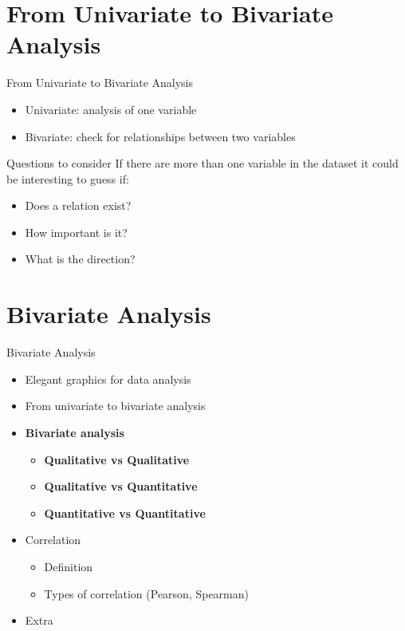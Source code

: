 \documentclass[
  ignorenonframetext,
]{beamer}
\providecommand{\tightlist}{%
  \setlength{\itemsep}{0pt}\setlength{\parskip}{0pt}}
\begin{document}
\section{From Univariate to Bivariate
Analysis}\label{from-univariate-to-bivariate-analysis-1}

\begin{frame}{From Univariate to Bivariate Analysis}
\begin{itemize}
\tightlist
\item
  Univariate: analysis of one variable
\item
  Bivariate: check for relationships between two variables
\end{itemize}
\end{frame}

\begin{frame}{Questions to consider}
\label{questions-to-consider}
If there are more than one variable in the dataset it could be
interesting to guess if:

\begin{itemize}
\tightlist
\item
  Does a relation exist?
\item
  How important is it?
\item
  What is the direction?
\end{itemize}
\end{frame}

\section{Bivariate Analysis}\label{bivariate-analysis}

\begin{frame}{Bivariate Analysis}
\begin{itemize}
\item
  Elegant graphics for data analysis
\item
  From univariate to bivariate analysis
\item
  \textbf{Bivariate analysis}

  \begin{itemize}
  \item
    \textbf{Qualitative vs Qualitative}
  \item
    \textbf{Qualitative vs Quantitative}
  \item
    \textbf{Quantitative vs Quantitative}
  \end{itemize}
\item
  Correlation

  \begin{itemize}
  \item
    Definition
  \item
    Types of correlation (Pearson, Spearman)
  \end{itemize}
\item
  Extra
\end{itemize}
\end{frame}
\end{document}
